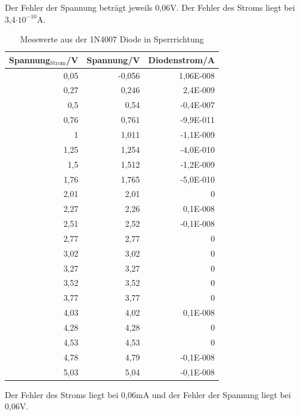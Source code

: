 \documentclass[12pt,a4paper]{article}
\begin{document}
Der Fehler der Spannung beträgt jeweils 0,06V. Der Fehler des Stroms liegt bei 3,4$\cdot 10^{-10}$A.


\begin{table}[H]
\caption{Messwerte aus der 1N4007 Diode in Sperrrichtung}
\begin{center}
\begin{tabular}{|r|r|r|}
\hline
\multicolumn{1}{|l|}{Spannung$_\text{Strom}$/V } & \multicolumn{1}{l|}{Spannung/V} & \multicolumn{1}{l|}{Diodenstrom/A} \\ \hline
0,05 & -0,056 & 1,06E-008 \\ \hline
0,27 & 0,246 & 2,4E-009 \\ \hline
0,5 & 0,54 & -0,4E-007 \\ \hline
0,76 & 0,761 & -9,9E-011 \\ \hline
1 & 1,011 & -1,1E-009 \\ \hline
1,25 & 1,254 & -4,0E-010 \\ \hline
1,5 & 1,512 & -1,2E-009 \\ \hline
1,76 & 1,765 & -5,0E-010 \\ \hline
2,01 & 2,01 & 0 \\ \hline
2,27 & 2,26 & 0,1E-008 \\ \hline
2,51 & 2,52 & -0,1E-008 \\ \hline
2,77 & 2,77 & 0 \\ \hline
3,02 & 3,02 & 0 \\ \hline
3,27 & 3,27 & 0 \\ \hline
3,52 & 3,52 & 0 \\ \hline
3,77 & 3,77 & 0 \\ \hline
4,03 & 4,02 & 0,1E-008 \\ \hline
4,28 & 4,28 & 0 \\ \hline
4,53 & 4,53 & 0 \\ \hline
4,78 & 4,79 & -0,1E-008 \\ \hline
5,03 & 5,04 & -0,1E-008 \\ \hline
\end{tabular}
\end{center}
\label{tab:a1_2}
\end{table}

Der Fehler des Stroms liegt bei 0,06mA und der Fehler der Spannung liegt bei 0,06V.
\end{document}
